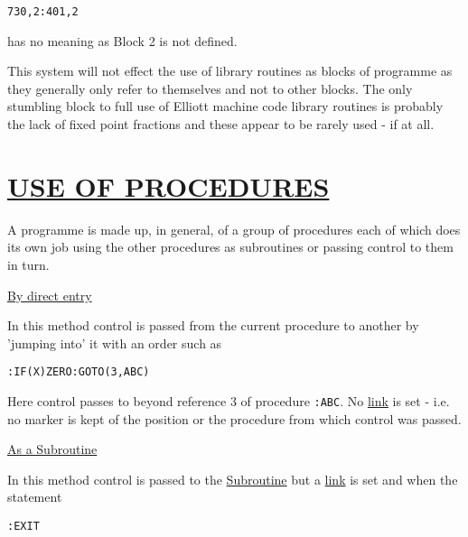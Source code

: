 \documentclass[10pt, a4paper, oneside]{article}
\newcommand{\myuline}[1]{\uline{#1}}
\newcommand{\mytt}[1]{\texttt{\scriptsize #1}}
\newcommand{\mytt}[1]{\texttt{\small #1}}
\begin{document}
\begin{multicols}{2}
\begin{addmargin}[1cm]{1em}%
\begin{lstlisting}
730,2:401,2
\end{lstlisting}
\end{addmargin}

\begin{flushleft}
has no meaning as Block 2 is not defined.
\end{flushleft}

This system will not effect the use of library
routines as blocks of programme as they generally only
refer to themselves and not to other blocks.  The only
stumbling block to full use of Elliott machine code
library routines is probably the lack of fixed point
fractions and these appear to be rarely used - if at
all.

\section{\myuline{USE OF PROCEDURES}}

A programme is made up, in general, of a group of
procedures each of which does its own job using the other
procedures as subroutines or passing control to them in
turn.

\vspace{1ex}
\noindent\myuline{By direct entry}

In this method control is passed from the current
procedure to another by 'jumping into' it with an order
such as

\begin{addmargin}[1cm]{1em}%
\begin{lstlisting}
:IF(X)ZERO:GOTO(3,ABC)
\end{lstlisting}
\end{addmargin}

Here control passes to beyond reference 3 of
procedure \mytt{:ABC}.  No \myuline{link} is set - i.e. no marker is
kept of the position or the procedure from which control
was passed.

\vspace{1ex}
\noindent\myuline{As a Subroutine}

In this method control is passed to the \myuline{Subroutine}
but a \myuline{link} is set and when the statement

\begin{addmargin}[1cm]{1em}%
\begin{lstlisting}
:EXIT
\end{lstlisting}
\end{addmargin}


\end{multicols}
\end{document}
